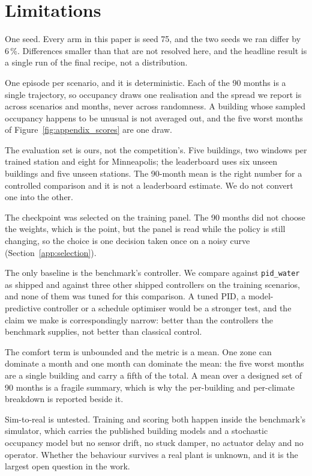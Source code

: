\documentclass{article}
\begin{document}
\section{Limitations}
\label{app:limits}

One seed. Every arm in this paper is seed 75, and the two seeds we ran differ by 6\,\%. Differences smaller than that are not resolved here, and the headline result is a single run of the final recipe, not a distribution.

One episode per scenario, and it is deterministic. Each of the 90 months is a single trajectory, so occupancy draws one realisation and the spread we report is across scenarios and months, never across randomness. A building whose sampled occupancy happens to be unusual is not averaged out, and the five worst months of Figure~\ref{fig:appendix_scores} are one draw.

The evaluation set is ours, not the competition's. Five buildings, two windows per trained station and eight for Minneapolis; the leaderboard uses six unseen buildings and five unseen stations. The 90-month mean is the right number for a controlled comparison and it is not a leaderboard estimate. We do not convert one into the other.

The checkpoint was selected on the training panel. The 90 months did not choose the weights, which is the point, but the panel is read while the policy is still changing, so the choice is one decision taken once on a noisy curve (Section~\ref{app:selection}).

The only baseline is the benchmark's controller. We compare against \texttt{pid\_water} as shipped and against three other shipped controllers on the training scenarios, and none of them was tuned for this comparison. A tuned PID, a model-predictive controller or a schedule optimiser would be a stronger test, and the claim we make is correspondingly narrow: better than the controllers the benchmark supplies, not better than classical control.

The comfort term is unbounded and the metric is a mean. One zone can dominate a month and one month can dominate the mean: the five worst months are a single building and carry a fifth of the total. A mean over a designed set of 90 months is a fragile summary, which is why the per-building and per-climate breakdown is reported beside it.

Sim-to-real is untested. Training and scoring both happen inside the benchmark's simulator, which carries the published building models and a stochastic occupancy model but no sensor drift, no stuck damper, no actuator delay and no operator. Whether the behaviour survives a real plant is unknown, and it is the largest open question in the work.
\end{document}
